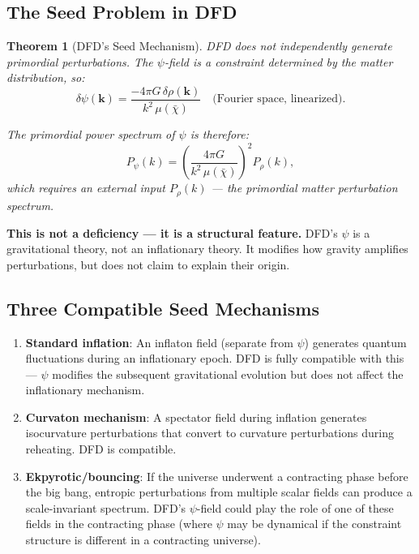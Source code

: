 \documentclass[11pt,a4paper]{article}
\newtheorem{theorem}{Theorem}
\begin{document}
\subsection{The Seed Problem in DFD}

\begin{theorem}[DFD's Seed Mechanism]
\label{thm:seeds}
DFD does not independently generate primordial perturbations. The $\psi$-field is a constraint determined by the matter distribution, so:
\begin{equation}
\delta\psi(\mathbf{k}) = \frac{-4\pi G\,\delta\rho(\mathbf{k})}{k^2\,\mu(\bar\chi)}\quad\text{(Fourier space, linearized)}.
\end{equation}

The primordial power spectrum of $\psi$ is therefore:
\begin{equation}
P_\psi(k) = \left(\frac{4\pi G}{k^2\,\mu(\bar\chi)}\right)^2 P_\rho(k),
\end{equation}
which requires an external input $P_\rho(k)$ --- the primordial matter perturbation spectrum.
\end{theorem}

\textbf{This is not a deficiency --- it is a structural feature.} DFD's $\psi$ is a gravitational theory, not an inflationary theory. It modifies how gravity amplifies perturbations, but does not claim to explain their origin.

\subsection{Three Compatible Seed Mechanisms}

\begin{enumerate}
\item \textbf{Standard inflation}: An inflaton field (separate from $\psi$) generates quantum fluctuations during an inflationary epoch. DFD is fully compatible with this --- $\psi$ modifies the subsequent gravitational evolution but does not affect the inflationary mechanism.

\item \textbf{Curvaton mechanism}: A spectator field during inflation generates isocurvature perturbations that convert to curvature perturbations during reheating. DFD is compatible.

\item \textbf{Ekpyrotic/bouncing}: If the universe underwent a contracting phase before the big bang, entropic perturbations from multiple scalar fields can produce a scale-invariant spectrum. DFD's $\psi$-field could play the role of one of these fields in the contracting phase (where $\psi$ may be dynamical if the constraint structure is different in a contracting universe).
\end{enumerate}
\end{document}

